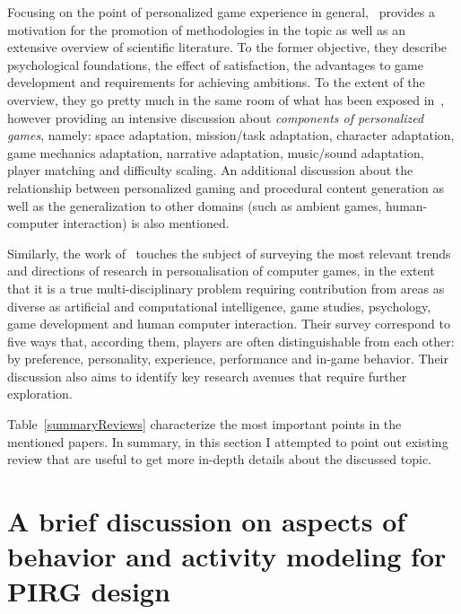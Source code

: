 Focusing on the point of personalized game experience in general,~\cite{bakkes_personalised_2012} provides a motivation for the promotion of methodologies in the topic as well as an extensive overview of scientific literature. To the former objective, they describe psychological foundations, the effect of satisfaction, the advantages to game development and requirements for achieving ambitions. To the extent of the overview, they go pretty much in the same room of what has been exposed in~\cite{bakkes_player_2012}, however providing an intensive discussion about \textit{components of personalized games}, namely: space adaptation, mission/task adaptation, character adaptation, game mechanics adaptation, narrative adaptation, music/sound adaptation, player matching and difficulty scaling. An additional discussion about the relationship between personalized gaming and procedural content generation as well as the generalization to other domains (such as ambient games, human-computer interaction) is also mentioned.

Similarly, the work of~\cite{karpinskyj_video_2014} touches the subject of surveying the most relevant trends and directions of research in personalisation of computer games, in the extent that it is a true multi-disciplinary problem requiring contribution from areas as diverse as artificial and computational intelligence, game studies, psychology, game development and human computer interaction. Their survey correspond to five ways that, according them, players are often distinguishable from each other: by preference, personality, experience, performance and in-game behavior. Their discussion also aims to identify key research avenues that require further exploration.  

Table~\ref{summaryReviews} characterize the most important points in the mentioned papers. In summary, in this section I attempted to point out existing review that are useful to get more in-depth details about the discussed topic.

\section{A brief discussion on aspects of behavior and activity modeling for PIRG design}\label{DDA}


